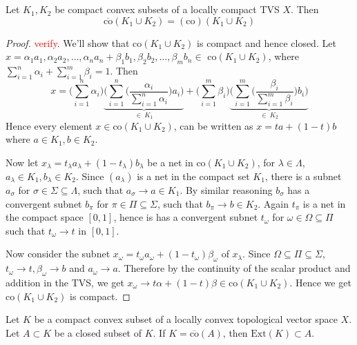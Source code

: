 
\chapter{}

\begin{lemma}
  Let $K_1, K_2$ be compact convex subsets of a locally compact TVS $X$. Then \[
    \overline{\textrm{co}}(K_1 \cup K_2) = (\textrm{co})( K_1 \cup K_2)
  \]
\end{lemma}
\begin{proof}
  \textcolor{red}{verify}.
  We'll show that $\textrm{co}(K_1 \cup K_2)$ is compact and hence closed. Let $x = \alpha_1a_1 , \alpha_2a_2 , \ldots , \alpha_na_n + \beta_1b_1 , \beta_2b_2 , \ldots , \beta_mb_n \in \textrm{ co}(K_1 \cup K_2)$, where $\sum_{i = 1}^{n} \alpha_i + \sum_{i = 1}^{m} \beta_i = 1$. Then \[
       x = \big(\sum_{i = 1}^{n} \alpha_i\big) \underbrace{\Bigg( \sum_{i = 1}^{n} \Big( \frac{\alpha_i}{\sum_{i = 1}^{n} \alpha_i}\Big) a_i\Bigg)}_{\in \ K_1}+ \big(\sum_{i = 1}^{m} \beta_i \big) \underbrace{\Bigg( \sum_{i = 1}^{m} \Big( \frac{\beta_i}{\sum_{i = 1}^{m} \beta_i}\Big) b_i\Bigg)}_{\in \ K_2}
  \]
  Hence every element $x \in \textrm{co}(K_1 \cup K_2)$, can be written as $x = ta + (1-t)b$ where $ a \in K_1, b \in K_2$.

  Now let $x_\lambda = t_\lambda a_\lambda + (1-t_\lambda)b_\lambda$ be a net in $\textrm{co}(K_1 \cup K_2)$, for $  \lambda \in \Lambda$, $a_\lambda \in K_1, b_\lambda \in K_2$. Since $(a_\lambda)$ is a net in the compact set $K_1$, there is a subnet $a_\sigma$ for $\sigma \in \Sigma \subseteq \Lambda$, such that $a_\sigma \to a \in K_1$. By similar reasoning $b_\sigma$ has a convergent subnet $b_\pi$ for $\pi \in \Pi \subseteq \Sigma$, such that $b_\pi \to b \in K_2$. Again $t_\pi$ is a net in the compact space $[0, 1]$, hence is has a convergent subnet $t_\omega$ for $ \omega \in \Omega \subseteq \Pi$ such that $t_\omega \to t$ in $[0, 1]$.

  Now consider the subnet $x_\omega = t_\omega a_\omega + (1-t_\omega)\beta_\omega$ of $x_\lambda$. Since $ \Omega \subseteq \Pi \subseteq \Sigma$, $t_\omega \to t, \beta_\omega \to b$ and $a_\omega \to a$. Therefore by the continuity of the scalar product and addition in the TVS, we get $x_\omega \to t \alpha + (1-t) \beta \in \textrm{co}(K_1 \cup K_2)$. Hence we get $\textrm{co}(K_1 \cup K_2)$ is compact.
\end{proof}

\begin{theorem}
  Let $K$ be a compact convex subset of a locally convex topological vector space $X$. Let $A \subset K$ be a closed subset of $K$. If $K = \overline{\textrm{co}}(A)$, then $\textrm{Ext}(K) \subset A$.
\end{theorem}

